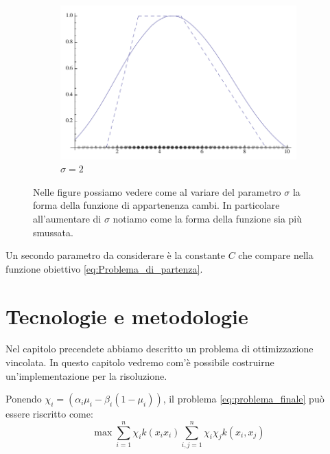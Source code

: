 \documentclass[a4paper,12pt]{report}
\begin{document}
\begin{figure}[h]
\begin{subfigure}[t]{0.32\textwidth}
    \end{subfigure}
    \begin{subfigure}[t]{0.32\textwidth}
        \centering
        \includegraphics[scale=0.18]{images/parametro_sigma_3.png}
        \caption{$\sigma = 2 $}
        \label{fig:sigma_3}
    \end{subfigure}
    \caption{Nelle figure possiamo vedere come al variare del parametro $\sigma$ la forma della funzione di appartenenza cambi. In particolare all'aumentare di $\sigma$ notiamo come la forma della funzione sia più smussata.}
    \label{fig:parametro_sigma}
\end{figure}

Un secondo parametro da considerare è la constante $C$ che compare nella funzione obiettivo \ref{eq:Problema_di_partenza}.








%
%

\chapter{Tecnologie e metodologie}
\label{Capitolo 2}
Nel capitolo precendete abbiamo descritto un problema di ottimizzazione vincolata. In questo capitolo vedremo com'è possibile costruirne un'implementazione per la risoluzione.

\bigskip

\noindent Ponendo $\chi_i = (\alpha_i\mu_i - \beta_i(1-\mu_i))$, il problema \ref{eq:problema_finale} può essere riscritto come:
\begin{equation}
    \max \displaystyle\sum_{i=1}^{n}\chi_ik(x_ix_i)\displaystyle\sum_{i,j=1}^{n}\chi_i\chi_j k(x_i,x_j)
\label{eq:problema_finale_2}
\end{equation}
\end{document}
